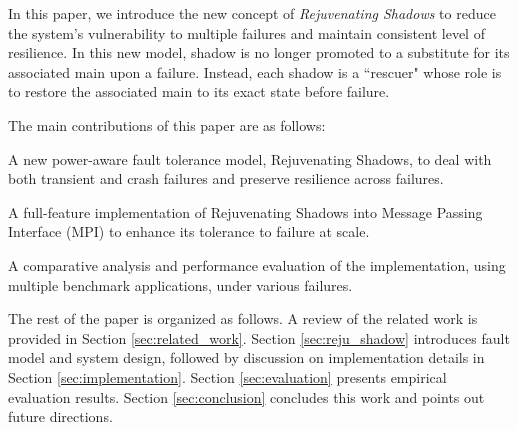 In this paper, we introduce the new concept of {\it Rejuvenating Shadows} to reduce the system's vulnerability to multiple failures and maintain consistent level of resilience. In this new model, shadow is no longer promoted to a substitute for its associated main upon a failure. Instead, each shadow is a ``rescuer" whose role is to restore the associated main to its exact state before failure. %

The main contributions of this paper are as follows:
\begin{itemize}
{
	\item A new power-aware fault tolerance model, Rejuvenating Shadows, to deal with both transient and crash failures and preserve resilience across failures.
   \item A full-feature implementation of Rejuvenating Shadows into Message Passing Interface (MPI) to enhance its tolerance to failure at scale.
   \item A comparative analysis and performance evaluation of the implementation, using multiple benchmark applications, under various failures.
}
\end{itemize}

The rest of the paper is organized as follows. A review of the related work is provided in Section 
\ref{sec:related_work}. Section \ref{sec:reju_shadow} introduces fault model and system design, followed by discussion on implementation details in Section \ref{sec:implementation}.
Section \ref{sec:evaluation} presents empirical evaluation results. Section \ref{sec:conclusion} concludes this work and points out future directions.





